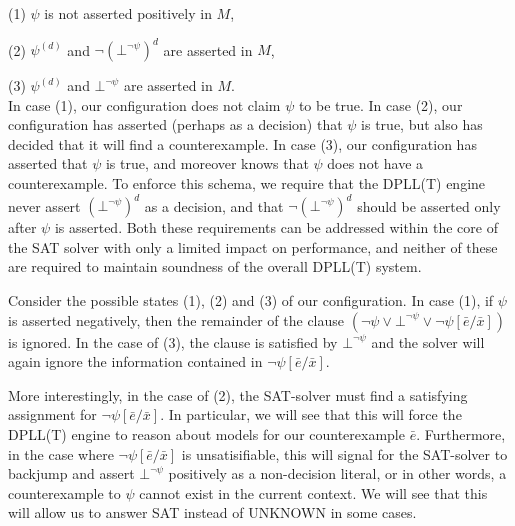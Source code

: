 \documentclass{llncs}
\begin{document}
(1) $\psi$ is not asserted positively in $M$, 

(2) $\psi^{(d)}$ and $\neg (\bot^{\neg \psi})^d$ are asserted in $M$, 

(3) $\psi^{(d)}$ and $\bot^{\neg \psi}$ are asserted in $M$. \\

In case (1), our configuration does not claim $\psi$ to be true.
In case (2), our configuration has asserted (perhaps as a decision) that $\psi$ is true, but also has decided that it will find a counterexample.
In case (3), our configuration has asserted that $\psi$ is true, and moreover knows that $\psi$ does not have a counterexample.
To enforce this schema, we require that the DPLL(T) engine never assert $(\bot^{\neg \psi})^d$ as a decision, and that $\neg (\bot^{\neg \psi})^d$ should be asserted only after $\psi$ is asserted.
Both these requirements can be addressed within the core of the SAT solver with only a limited impact on performance, and neither of these are required to maintain soundness of the overall DPLL(T) system.


Consider the possible states (1), (2) and (3) of our configuration.
In case (1), if $\psi$ is asserted negatively, then the remainder of the clause $( \neg \psi \vee \bot^{\neg \psi} \vee \neg \psi[\bar{e}/\bar{x}])$ is ignored.
In the case of (3), the clause is satisfied by $\bot^{\neg \psi}$ and the solver will again ignore the information contained in $\neg \psi[\bar{e}/\bar{x}]$.

More interestingly, in the case of (2), the SAT-solver must find a satisfying assignment for $\neg \psi[\bar{e}/\bar{x}]$.
In particular, we will see that this will force the DPLL(T) engine to reason about models for our counterexample $\bar{e}$.
Furthermore, in the case where $\neg \psi[\bar{e}/\bar{x}]$ is unsatisifiable, this will signal for the SAT-solver to backjump and assert $\bot^{\neg \psi}$ positively as a non-decision literal, or in other words, a counterexample to $\psi$ cannot exist in the current context.
We will see that this will allow us to answer SAT instead of UNKNOWN in some cases.
\end{document}
